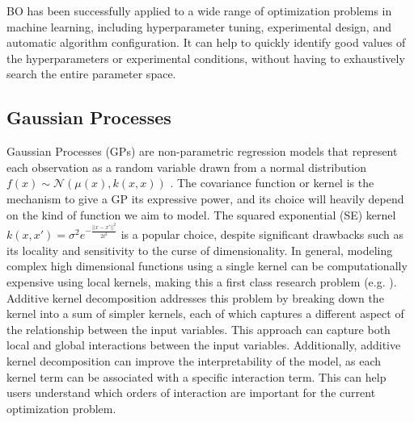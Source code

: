\documentclass{IOS-Book-Article}
\begin{document}
	BO has been successfully applied to a wide range of optimization problems in machine learning, including hyperparameter tuning, experimental design, and automatic algorithm configuration. It can help to quickly identify good values of the hyperparameters or experimental conditions, without having to exhaustively search the entire parameter space.
	
	\subsection{Gaussian Processes}
	Gaussian Processes (GPs) are non-parametric regression models that represent each observation as a random variable drawn from a normal distribution $f(x) \sim \mathcal{N}(\mu(x), k(x,x))$ \cite{gaussian-processes}. The covariance function or kernel is the mechanism to give a GP its expressive power, and its choice will heavily depend on the kind of function we aim to model\cite{kernel-composition}. The squared exponential (SE) kernel $k(x,x') = \sigma^2 e^{-\frac{||x-x'||^2}{2l^2}}$ is a popular choice, despite significant drawbacks such as its locality and sensitivity to the curse of dimensionality\cite{curse-dimensionality}.
	In general, modeling complex high dimensional functions using a single kernel can be computationally expensive using local kernels, making this a first class research problem (e.g. \cite{gp-high-dim}\cite{gp-high-dim2}).
	Additive kernel decomposition\cite{gp-additive} addresses this problem by breaking down the kernel into a sum of simpler kernels, each of which captures a different aspect of the relationship between the input variables. This approach can capture both local and global interactions between the input variables. Additionally, additive kernel decomposition can improve the interpretability of the model, as each kernel term can be associated with a specific interaction term. This can help users understand which orders of interaction are important for the current optimization problem. 
		
\end{document}
